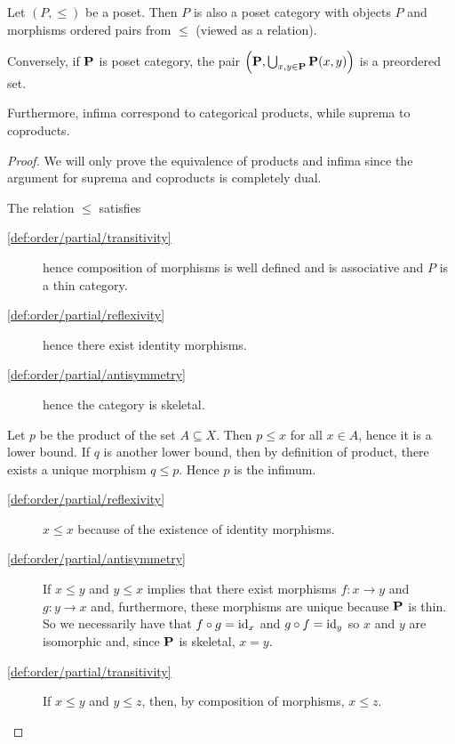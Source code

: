 \begin{proposition}\label{thm:poset_iff_poset_category}
  Let $(P, \leq)$ be a poset. Then $P$ is also a poset category with objects $P$ and morphisms ordered pairs from $\leq$ (viewed as a relation).

  Conversely, if $\operatorname{\mathbf{P}}$ is poset category, the pair $\left(\operatorname{\mathbf{P}}, \bigcup_{x, y \in \operatorname{\mathbf{P}}} \operatorname{\mathbf{P}}(x, y) \right)$ is a preordered set.

  Furthermore, infima correspond to categorical products, while suprema to coproducts.
\end{proposition}
\begin{proof}
  We will only prove the equivalence of products and infima since the argument for suprema and coproducts is completely dual.

  \begin{description}
    \Implies The relation $\leq$ satisfies
    \begin{description}
      \item[\ref{def:order/partial/transitivity}] hence composition of morphisms is well defined and is associative and $P$ is a thin category.
      \item[\ref{def:order/partial/reflexivity}] hence there exist identity morphisms.
      \item[\ref{def:order/partial/antisymmetry}] hence the category is skeletal.
    \end{description}

    Let $p$ be the product of the set $A \subseteq X$. Then $p \leq x$ for all $x \in A$, hence it is a lower bound. If $q$ is another lower bound, then by definition of product, there exists a unique morphism $q \leq p$. Hence $p$ is the infimum.

    \ImpliedBy\mbox{}
    \begin{description}
      \item[\ref{def:order/partial/reflexivity}] $x \leq x$ because of the existence of identity morphisms.
      \item[\ref{def:order/partial/antisymmetry}] If $x \leq y$ and $y \leq x$ implies that there exist morphisms $f: x \to y$ and $g: y \to x$ and, furthermore, these morphisms are unique because $\operatorname{\mathbf{P}}$ is thin. So we necessarily have that $f \circ g = \operatorname{id}_x$ and $g \circ f = \operatorname{id}_y$ so $x$ and $y$ are isomorphic and, since $\operatorname{\mathbf{P}}$ is skeletal, $x = y$.
      \item[\ref{def:order/partial/transitivity}] If $x \leq y$ and $y \leq z$, then, by composition of morphisms, $x \leq z$.
    \end{description}


\end{description}
\end{proof}
